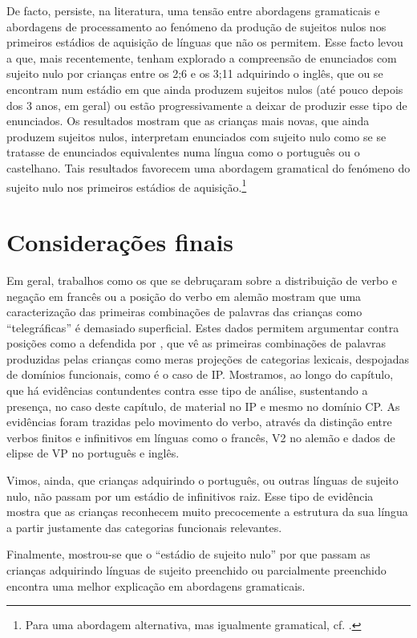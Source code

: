 \documentclass[output=paper]{LSP/langsci}
\begin{document}
De facto, persiste, na literatura, uma tensão entre abordagens gramaticais e abordagens de processamento ao fenómeno da produção de sujeitos nulos nos primeiros estádios de aquisição de línguas que não os permitem. Esse facto levou a que, mais recentemente, \citet{orfitellihyams2012} tenham explorado a compreensão de enunciados com sujeito nulo por crianças entre os 2;6 e os 3;11 adquirindo o inglês, que ou se encontram num estádio em que ainda produzem sujeitos nulos (até pouco depois dos 3 anos, em geral) ou estão progressivamente a deixar de produzir esse tipo de enunciados. Os resultados mostram que as crianças mais novas, que ainda produzem sujeitos nulos, interpretam enunciados com sujeito nulo como se se tratasse de enunciados equivalentes numa língua como o português ou o castelhano. Tais resultados favorecem uma abordagem gramatical do fenómeno do sujeito nulo nos primeiros estádios de aquisição.\footnote{Para uma abordagem alternativa, mas igualmente gramatical, cf. \citealt{lopes2003}.}

\section{Considerações finais}
\label{sec:santoslopes_conclusao}

Em geral, trabalhos como os que se debruçaram sobre a distribuição de verbo e negação em francês ou a posição do verbo em alemão mostram que uma caracterização das primeiras combinações de palavras das crianças como “telegráficas” é demasiado superficial. Estes dados permitem argumentar contra posições como a defendida por \citet{radford1988}, que vê as primeiras combinações de palavras produzidas pelas crianças como meras projeções de categorias lexicais, despojadas de domínios funcionais, como é o caso de IP. Mostramos, ao longo do capítulo, que há evidências contundentes contra esse tipo de análise, sustentando a presença, no caso deste capítulo, de material no IP e mesmo no domínio CP. As evidências foram trazidas pelo movimento do verbo, através da distinção entre verbos finitos e infinitivos em línguas como o francês, V2 no alemão e dados de elipse de VP no português e inglês.

Vimos, ainda, que crianças adquirindo o português, ou outras línguas de sujeito nulo, não passam por um estádio de infinitivos raiz. Esse tipo de evidência mostra que as crianças reconhecem muito precocemente a estrutura da sua língua a partir justamente das categorias funcionais relevantes.

Finalmente, mostrou-se que o “estádio de sujeito nulo”  por que passam as crianças adquirindo línguas de sujeito preenchido ou parcialmente preenchido encontra uma melhor explicação em abordagens gramaticais.


{\sloppy
\printbibliography[heading=subbibliography,notkeyword=this]
}
\end{document}
